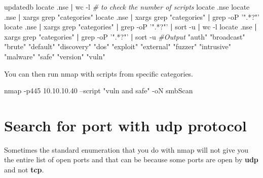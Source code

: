 \documentclass{assets/ipesethesis}
\newenvironment{Shaded}{\begin{snugshade}}{\end{snugshade}}
\newcommand{\CommentTok}[1]{\textcolor[rgb]{0.56,0.35,0.01}{\textit{#1}}}
\newcommand{\FunctionTok}[1]{\textcolor[rgb]{0.00,0.00,0.00}{#1}}
\newcommand{\KeywordTok}[1]{\textcolor[rgb]{0.13,0.29,0.53}{\textbf{#1}}}
\newcommand{\NormalTok}[1]{#1}
\newcommand{\StringTok}[1]{\textcolor[rgb]{0.31,0.60,0.02}{#1}}
\begin{document}
\begin{Shaded}
\begin{Highlighting}[]
\FunctionTok{updatedb}
\FunctionTok{locate}\NormalTok{ .nse }\KeywordTok{|} \FunctionTok{wc}\NormalTok{ -l }\CommentTok{# to check the number of scripts}
\FunctionTok{locate}\NormalTok{ .nse}
\FunctionTok{locate}\NormalTok{ .nse }\KeywordTok{|} \FunctionTok{xargs}\NormalTok{ grep }\StringTok{"categories"}
\FunctionTok{locate}\NormalTok{ .nse }\KeywordTok{|} \FunctionTok{xargs}\NormalTok{ grep }\StringTok{"categories"} \KeywordTok{|} \FunctionTok{grep}\NormalTok{ -oP }\StringTok{'".*?"'}
\FunctionTok{locate}\NormalTok{ .nse }\KeywordTok{|} \FunctionTok{xargs}\NormalTok{ grep }\StringTok{"categories"} \KeywordTok{|} \FunctionTok{grep}\NormalTok{ -oP }\StringTok{'".*?"'} \KeywordTok{|} \FunctionTok{sort}\NormalTok{ -u }\KeywordTok{|} \FunctionTok{wc}\NormalTok{ -l}
\FunctionTok{locate}\NormalTok{ .nse }\KeywordTok{|} \FunctionTok{xargs}\NormalTok{ grep }\StringTok{"categories"} \KeywordTok{|} \FunctionTok{grep}\NormalTok{ -oP }\StringTok{'".*?"'} \KeywordTok{|} \FunctionTok{sort}\NormalTok{ -u}
\CommentTok{#Output}
\StringTok{"auth"}
\StringTok{"broadcast"}
\StringTok{"brute"}
\StringTok{"default"}
\StringTok{"discovery"}
\StringTok{"dos"}
\StringTok{"exploit"}
\StringTok{"external"}
\StringTok{"fuzzer"}
\StringTok{"intrusive"}
\StringTok{"malware"}
\StringTok{"safe"}
\StringTok{"version"}
\StringTok{"vuln"}
\end{Highlighting}
\end{Shaded}

You can then run nmap with scripts from specific categories.

\begin{Shaded}
\begin{Highlighting}[]
\FunctionTok{nmap}\NormalTok{ -p445 10.10.10.40 --script }\StringTok{"vuln and safe"}\NormalTok{ -oN smbScan}
\end{Highlighting}
\end{Shaded}

\hypertarget{search-for-port-with-udp-protocol}{%
\section*{Search for port with udp protocol}\label{search-for-port-with-udp-protocol}}

Sometimes the standard enumeration that you do with nmap will not give you the entire list of open ports and that can be because
some ports are open by \textbf{udp} and not \textbf{tcp}.
\end{document}
